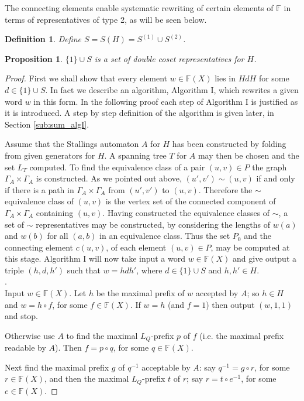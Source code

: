 \documentclass[a4paper,12pt]{article}
\newcommand{\G}{\Gamma }
\newtheorem{proposition}[theorem]{Proposition}
\newtheorem{definition}[theorem]{Definition}
\numberwithin{equation}{section}
\numberwithin{figure}{section}
\newcommand{\FF}{\ensuremath{\mathbb{F}}}
\begin{document}
The  connecting elements enable systematic rewriting of certain
elements of $\FF$ in terms of representatives of type 2, as will be
seen below.
\begin{definition}\label{def:dcreps} 
Define $S=S(H)=S^{(1)}\cup S^{(2)}$.
\end{definition}

\begin{proposition}\label{prop:dcreps}
$\{1\}\cup S$ is a set of double coset representatives for $H$.
\end{proposition}
\begin{proof}
First we shall show that every element $w\in \FF(X)$ lies in $HdH$ 
for some $d\in \{1\}\cup S$. In fact we describe an algorithm, Algorithm I, which rewrites a  given word $w$ in this form. 
 In the following proof each
step of Algorithm I is justified as it is introduced. A step by step
definition 
 of the algorithm is given later, in Section \ref{sub:sum_algI}.

Assume that the Stallings automaton $A$ for $H$ has been constructed by folding from
given generators for $H$. A spanning tree $T$
for $A$ may then be chosen and the
set $L_T$ computed.
To find the equivalence class of a pair $(u,v)\in P$ the
graph $\G_A\times \G_A$ is constructed. As we pointed out above, $(u',v')\sim
(u,v)$ if and only if there is a path in $\G_A\times \G_A$ from $(u',v')$
to $(u,v)$. Therefore the $\sim$ equivalence class of $(u,v)$ is the
vertex set of the connected component of $\G_A\times \G_A$ containing
$(u,v)$.
Having constructed the equivalence classes of $\sim$,
 a set of $\sim$ representatives may be constructed, by considering the
lengths of $w(a)$ and $w(b)$ for all $(a,b)$ in an equivalence class. Thus the
set $P_0$ and the connecting element $c(u,v)$, of each element
$(u,v)\in P$, may be computed at this stage. Algorithm
I will now take input a word $w\in  \FF(X)$ and give output a triple
$(h,d,h')$ such that $w=hdh'$, where $d\in \{1\}\cup S$ and $h,h'\in H$.\\

.\\
Input $w\in \FF(X)$.
Let $h$ be the maximal prefix of $w$ accepted by $A$; so $h\in H$ and
$w=h\circ f$, for some $f\in \FF(X)$. 
If $w=h$ (and $f=1$) then output $(w,1,1)$ and stop. 

Otherwise use $A$ to find the maximal
$L_Q$-prefix $p$
of $f$ (i.e. the maximal prefix readable by $A$). Then
  $f= p\circ q$, for some $q\in \FF(X)$.

Next find the maximal prefix $g$ of $q^{-1}$ acceptable by $A$: say
$q^{-1}=g\circ r$, for some $r\in \FF(X)$, and then the maximal $L_Q$-prefix
$t$ of $r$; say $r=t\circ e^{-1}$, for some $e\in \FF(X)$.


\end{proof}
\end{document}
